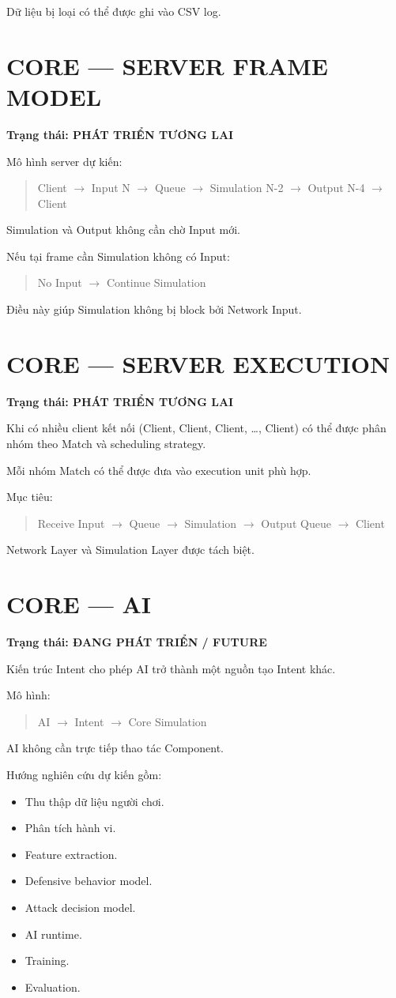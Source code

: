 \documentclass[12pt,a4paper]{article}
\newcommand{\flow}[1]{%
  \begin{quote}\centering\ttfamily #1\end{quote}%
}
\begin{document}
Dữ liệu bị loại có thể được ghi vào CSV log.

\section{CORE --- SERVER FRAME MODEL}
\textbf{Trạng thái: PHÁT TRIỂN TƯƠNG LAI}

Mô hình server dự kiến:

\flow{Client $\rightarrow$ Input N $\rightarrow$ Queue $\rightarrow$ Simulation N-2 $\rightarrow$ Output N-4 $\rightarrow$ Client}

Simulation và Output không cần chờ Input mới.

Nếu tại frame cần Simulation không có Input:

\flow{No Input $\rightarrow$ Continue Simulation}

Điều này giúp Simulation không bị block bởi Network Input.

\section{CORE --- SERVER EXECUTION}
\textbf{Trạng thái: PHÁT TRIỂN TƯƠNG LAI}

Khi có nhiều client kết nối (Client, Client, Client, \ldots, Client) có thể được phân nhóm theo Match và scheduling strategy.

Mỗi nhóm Match có thể được đưa vào execution unit phù hợp.

Mục tiêu:

\flow{Receive Input $\rightarrow$ Queue $\rightarrow$ Simulation $\rightarrow$ Output Queue $\rightarrow$ Client}

Network Layer và Simulation Layer được tách biệt.

\section{CORE --- AI}
\textbf{Trạng thái: ĐANG PHÁT TRIỂN / FUTURE}

Kiến trúc Intent cho phép AI trở thành một nguồn tạo Intent khác.

Mô hình:

\flow{AI $\rightarrow$ Intent $\rightarrow$ Core Simulation}

AI không cần trực tiếp thao tác Component.

Hướng nghiên cứu dự kiến gồm:
\begin{itemize}[nosep]
  \item Thu thập dữ liệu người chơi.
  \item Phân tích hành vi.
  \item Feature extraction.
  \item Defensive behavior model.
  \item Attack decision model.
  \item AI runtime.
  \item Training.
  \item Evaluation.
\end{itemize}
\end{document}
